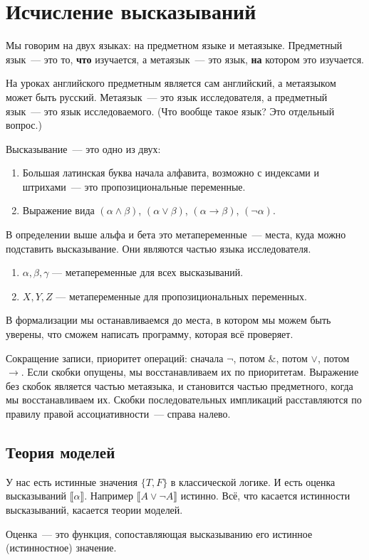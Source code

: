 
\section{Исчисление высказываний}
Мы говорим на двух языках: на предметном языке и метаязыке.
Предметный язык~--- это то, \textbf{что} изучается, а метаязык~--- это язык, \textbf{на} котором это изучается.

На уроках английского предметным является сам английский, а метаязыком может быть русский.
Метаязык~--- это язык исследователя, а предметный язык~--- это язык исследоваемого.
(Что вообще такое язык? Это отдельный вопрос.)

Высказывание~--- это одно из двух: 
\begin{enumerate}
\item Большая латинская буква начала алфавита, возможно с индексами и штрихами~--- это пропозициональные переменные.
\item Выражение вида $(\alpha \land \beta)$, $(\alpha \lor \beta)$, $(\alpha \to \beta)$, $(\neg \alpha)$. 
\end{enumerate}

В определении выше альфа и бета это метапеременные~--- места, куда можно подставить высказывание.
Они являются частью языка исследователя.
\begin{enumerate}
\item $\alpha, \beta, \gamma$ --- метапеременные для всех высказываний.
\item $X, Y, Z$ --- метапеременные для пропозициональных переменных.
\end{enumerate}

В формализации мы останавливаемся до места, в котором мы можем быть уверены, что сможем написать программу, которая всё проверяет.

Сокращение записи, приоритет операций: сначала $\neg$, потом $\&$, потом $\vee$, потом $\to$.
Если скобки опущены, мы восстанавливаем их по приоритетам.
Выражение без скобок является частью метаязыка, и становится частью предметного, когда мы восстанавливаем их.
Скобки последовательных импликаций расставляются по правилу правой ассоциативности~--- справа налево.
\subsection{Теория моделей}
У нас есть истинные значения $\{T, F\}$ в классической логике. 
И есть оценка высказываний $\llbracket \alpha\rrbracket$. 
Например $\llbracket A \lor \neg A\rrbracket$ истинно.
Всё, что касается истинности высказываний, касается теории моделей. 
\begin{definition}
    Оценка~--- это функция, сопоставляющая высказыванию его истинное (истинностное) значение.
\end{definition}
